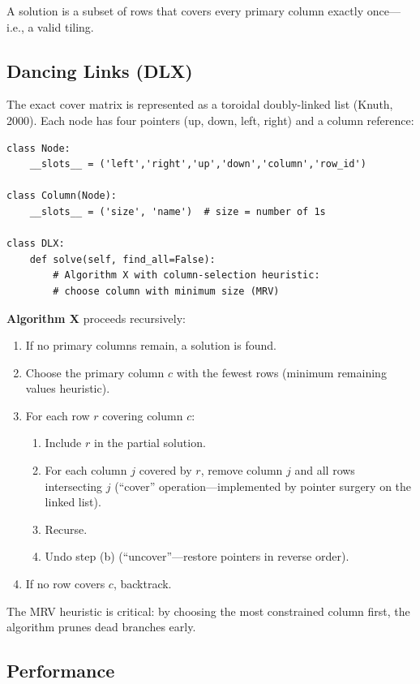 \documentclass[11pt]{article}
\begin{document}
A solution is a subset of rows that covers every primary column exactly once---i.e., a valid tiling.

\subsection{Dancing Links (DLX)}

The exact cover matrix is represented as a toroidal doubly-linked list (Knuth, 2000). Each node has four pointers (up, down, left, right) and a column reference:

\begin{lstlisting}
class Node:
    __slots__ = ('left','right','up','down','column','row_id')

class Column(Node):
    __slots__ = ('size', 'name')  # size = number of 1s

class DLX:
    def solve(self, find_all=False):
        # Algorithm X with column-selection heuristic:
        # choose column with minimum size (MRV)
\end{lstlisting}

\textbf{Algorithm X} proceeds recursively:
\begin{enumerate}[nosep]
  \item If no primary columns remain, a solution is found.
  \item Choose the primary column $c$ with the fewest rows (minimum remaining values heuristic).
  \item For each row $r$ covering column $c$:
  \begin{enumerate}[nosep]
    \item Include $r$ in the partial solution.
    \item For each column $j$ covered by $r$, remove column $j$ and all rows intersecting $j$ (``cover'' operation---implemented by pointer surgery on the linked list).
    \item Recurse.
    \item Undo step (b) (``uncover''---restore pointers in reverse order).
  \end{enumerate}
  \item If no row covers $c$, backtrack.
\end{enumerate}

The MRV heuristic is critical: by choosing the most constrained column first, the algorithm prunes dead branches early.

\subsection{Performance}
\end{document}
